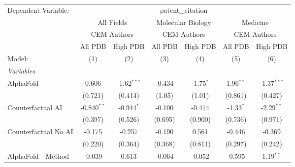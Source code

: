 \begingroup
\centering
\begin{tabular}{lcccccc}
   \tabularnewline \midrule \midrule
   Dependent Variable: & \multicolumn{6}{c}{patent\_citation}\\
 & \multicolumn{2}{c}{All Fields} & \multicolumn{2}{c}{Molecular Biology} & \multicolumn{2}{c}{Medicine} \\
\cmidrule(lr){2-3} \cmidrule(lr){4-5} \cmidrule(lr){6-7}
 & \multicolumn{2}{c}{CEM Authors} & \multicolumn{2}{c}{CEM Authors} & \multicolumn{2}{c}{CEM Authors} \\
\cmidrule(lr){2-3} \cmidrule(lr){4-5} \cmidrule(lr){6-7}
 & \multicolumn{1}{c}{All PDB} & \multicolumn{1}{c}{High PDB} & \multicolumn{1}{c}{All PDB} & \multicolumn{1}{c}{High PDB} & \multicolumn{1}{c}{All PDB} & \multicolumn{1}{c}{High PDB} \\
\cmidrule(lr){2-2} \cmidrule(lr){3-3} \cmidrule(lr){4-4} \cmidrule(lr){5-5} \cmidrule(lr){6-6} \cmidrule(lr){7-7}
   Model:                                                     & (1)           & (2)           & (3)           & (4)           & (5)           & (6)\\  
   \midrule
   \emph{Variables}\\
   AlphaFold                                                  & 0.606         & -1.62$^{***}$ & -0.434        & -1.75$^{*}$   & 1.96$^{**}$   & -1.37$^{***}$\\   
                                                              & (0.721)       & (0.414)       & (1.05)        & (1.01)        & (0.861)       & (0.427)\\   
   Counterfactual AI                                          & -0.840$^{**}$ & -0.944$^{*}$  & -0.100        & -0.414        & -1.33$^{*}$   & -2.29$^{**}$\\   
                                                              & (0.397)       & (0.526)       & (0.695)       & (0.900)       & (0.736)       & (0.971)\\   
   Counterfactual No AI                                       & -0.175        & -0.257        & -0.190        & 0.561         & -0.446        & -0.369\\   
                                                              & (0.220)       & (0.364)       & (0.368)       & (0.811)       & (0.297)       & (0.242)\\   
   AlphaFold - Method                                         & -0.039        & 0.613         & -0.064        & -0.052        & -0.595        & 1.19$^{**}$\\   

\end{tabular}
